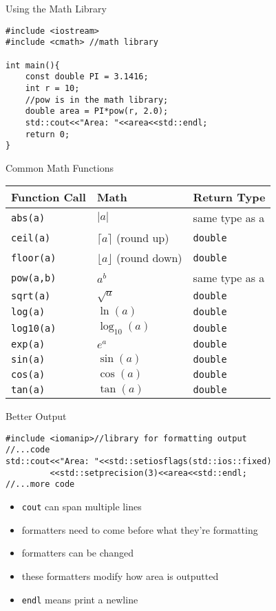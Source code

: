 \documentclass[xcolor={dvipsnames}]{beamer}
\begin{document}
\begin{frame}[fragile]{Using the Math Library}
\begin{verbatim}
#include <iostream>
#include <cmath> //math library

int main(){
    const double PI = 3.1416;
    int r = 10;
    //pow is in the math library;
    double area = PI*pow(r, 2.0);
    std::cout<<"Area: "<<area<<std::endl;
    return 0;
}
\end{verbatim}
\end{frame} 

\begin{frame}{Common Math Functions}

\begin{tabularx}{\textwidth}{| X | X | X |}
\hline
\textbf{Function Call}& \textbf{Math} & \textbf{Return Type}\\
\hline
\hline
\texttt{abs(a)} & $\lvert a \rvert$ & same type as a\\
\texttt{ceil(a)} &$ \lceil a \rceil$ (round up) & \texttt{double}\\
\texttt{floor(a)}&$ \lfloor a \rfloor$ (round down) & \texttt{double}\\
\hline
\hline
\texttt{pow(a,b)} & $a^b$ & same type as a \\
\texttt{sqrt(a)} & $\sqrt{a}$ & \texttt{double}\\
\hline
\hline
\texttt{log(a)} & $\ln(a)$ & \texttt{double}\\
\texttt{log10(a)} & $\log_{10}(a)$ & \texttt{double}\\
\texttt{exp(a)} & $e^{a}$ & \texttt{double}\\
\hline
\hline
\texttt{sin(a)} & $\sin(a)$ & \texttt{double}\\
\texttt{cos(a)} & $\cos(a)$ & \texttt{double}\\
\texttt{tan(a)} & $\tan(a)$ & \texttt{double}\\
\hline
\end{tabularx}
\end{frame}

\begin{frame}[fragile]{Better Output}
\begin{verbatim}
#include <iomanip>//library for formatting output
//...code
std::cout<<"Area: "<<std::setiosflags(std::ios::fixed)
         <<std::setprecision(3)<<area<<std::endl;
//...more code
\end{verbatim}

\begin{block}{}
	\begin{itemize}
		\item \texttt{cout} can span multiple lines
		\item formatters need to come before what they're formatting
		\item formatters can be changed
		\item these formatters modify how area is outputted
		\item \texttt{endl} means print a newline
	\end{itemize}
\end{block}
\end{frame}
\end{document}
